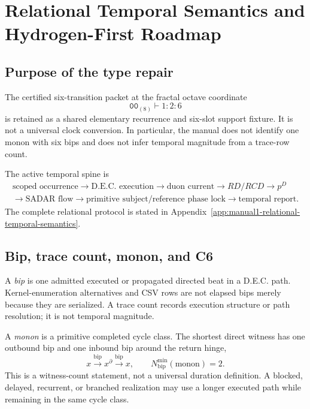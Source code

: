 \section{Relational Temporal Semantics and Hydrogen-First Roadmap}
\label{app:manual1-relational-temporal-roadmap}

\subsection{Purpose of the type repair}

The certified six-transition packet at the fractal octave coordinate
\[
\mathtt{00}_{(8)}\vdash 1{:}2{:}6
\]
is retained as a shared elementary recurrence and six-slot support fixture.
It is not a universal clock conversion.  In particular, the manual does not
identify one monon with six bips and does not infer temporal magnitude from a
trace-row count.

The active temporal spine is
\[
\boxed{
\begin{gathered}
\text{scoped occurrence}
\longrightarrow
\text{D.E.C. execution}
\longrightarrow
\text{duon current}
\longrightarrow
RD/RCD
\longrightarrow
p^D
\\[-0.1em]
\longrightarrow
\text{SADAR flow}
\longrightarrow
\text{primitive subject/reference phase lock}
\longrightarrow
\text{temporal report}.
\end{gathered}}
\]
The complete relational protocol is stated in
Appendix~\ref{app:manual1-relational-temporal-semantics}.

\subsection{Bip, trace count, monon, and C6}

A \emph{bip} is one admitted executed or propagated directed beat in a
D.E.C. path.  Kernel-enumeration alternatives and CSV rows are not elapsed
bips merely because they are serialized.  A trace count records execution
structure or path resolution; it is not temporal magnitude.

A \emph{monon} is a primitive completed cycle class.  The shortest direct
witness has one outbound bip and one inbound bip around the return hinge,
\[
x\xrightarrow{\mathrm{bip}}x^\partial
 \xrightarrow{\mathrm{bip}}x,
\qquad
N_{\mathrm{bip}}^{\min}(\mathrm{monon})=2.
\]
This is a witness-count statement, not a universal duration definition.  A
blocked, delayed, recurrent, or branched realization may use a longer executed
path while remaining in the same cycle class.

